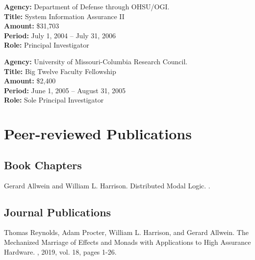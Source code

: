 \documentclass[12pt]{article} %
\begin{document}
{\bf Agency:} Department of Defense through OHSU/OGI.
\\
{\bf Title:} System Information Assurance II
\\
{\bf Amount:} \$31,703 
\\
{\bf Period:}   July 1, 2004  --  July 31, 2006
\\
{\bf Role:}      Principal Investigator


{\bf Agency:} University of Missouri-Columbia Research Council.
\\
{\bf Title:} Big Twelve Faculty Fellowship
\\
{\bf Amount:} \$2,400
\\
{\bf Period:}   June 1, 2005  --  August 31, 2005 
\\
{\bf Role:}      Sole Principal Investigator
\\


\section*{Peer-reviewed Publications}

\subsection*{Book Chapters}

Gerard Allwein and William L. Harrison.
\newblock Distributed Modal Logic.
.


\subsection*{Journal Publications}


Thomas Reynolds, Adam Procter, William L. Harrison, and Gerard Allwein.
\newblock The Mechanized Marriage of Effects and Monads with Applications to High Assurance Hardware.
, 2019, vol. 18, pages 1-26. 
\\
\end{document}
